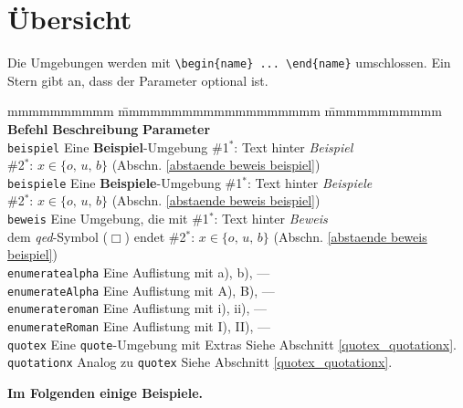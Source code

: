 		\section{Übersicht}
			Die Umgebungen werden mit \verb|\begin{name} ... \end{name}| umschlossen. Ein Stern gibt an, dass der Parameter optional ist.
			\begin{tabbing}
				mmmmmmmmmm				\= mmmmmmmmmmmmmmmmmmm							\= mmmmmmmmmmm																					\kill
				\textbf{Befehl}			\> \textbf{Beschreibung}						\> \textbf{Parameter} 																			\\
				\verb|beispiel|			\> Eine \textbf{Beispiel}-Umgebung 				\> \#1${}^*$: Text hinter \emph{Beispiel} 														\\
										\>												\> \#2${}^*$: $x \in \{o, \, u, \, b\}$ (Abschn. \ref{abstaende beweis beispiel}) 				\\
				\verb|beispiele|		\> Eine \textbf{Beispiele}-Umgebung 			\> \#1${}^*$: Text hinter \emph{Beispiele} 														\\
										\>												\> \#2${}^*$: $x \in \{o, \, u, \, b\}$ (Abschn. \ref{abstaende beweis beispiel}) 				\\
				\verb|beweis|			\> Eine Umgebung, die mit 						\> \#1${}^*$: Text hinter \emph{Beweis}															\\
										\> dem \emph{qed}-Symbol ($\Box$) endet			\> \#2${}^*$: $x \in \{o, \, u, \, b\}$ (Abschn. \ref{abstaende beweis beispiel})				\\
				\verb|enumeratealpha|	\> Eine Auflistung mit a), b), \ellipse			\> ---																							\\
				\verb|enumerateAlpha|	\> Eine Auflistung mit A), B), \ellipse 		\> ---																							\\
				\verb|enumerateroman|	\> Eine Auflistung mit i), ii), \ellipse		\> ---																							\\
				\verb|enumerateRoman|	\> Eine Auflistung mit I), II), \ellipse		\> ---																							\\
				\verb|quotex|			\> Eine \texttt{quote}-Umgebung mit Extras
																						\> Siehe Abschnitt \ref{quotex_quotationx}.														\\
				\verb|quotationx|		\>	Analog zu \texttt{quotex}					\> Siehe Abschnitt \ref{quotex_quotationx}.
			\end{tabbing}

			\noindent \textbf{Im Folgenden einige Beispiele.}

